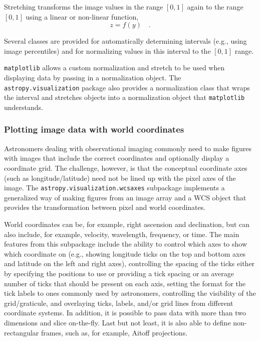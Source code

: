 \documentclass[modern]{aastex62}
\newcommand{\package}[1]{\texttt{#1}\xspace}
\begin{document}
Stretching transforms the image values in the range $[0,1]$ again to the range
$[0,1]$ using a linear or non-linear function,
\begin{equation}
z = f(y) \quad .
\end{equation}

Several classes are provided for automatically determining intervals
(e.g., using image percentiles) and for normalizing values in this interval to
the $[0,1]$ range.

\package{matplotlib} allows a custom normalization and stretch to be used when
displaying data by passing in a normalization object.
The \package{astropy.visualization} package also provides a normalization class
that wraps the interval and stretches objects into a normalization object that
\package{matplotlib} understands.

\subsubsection{Plotting image data with world coordinates}

Astronomers dealing with observational imaging commonly need to make figures
with images that include the correct coordinates and optionally display a
coordinate grid. The challenge, however, is that the conceptual coordinate axes
(such as longitude/latitude) need not be lined up with the pixel axes of the
image. The \package{astropy.visualization.wcsaxes} subpackage implements a
generalized way of making figures from an image array and a WCS object
that provides the transformation between pixel and world coordinates.

World coordinates can be, for example, right ascension and declination, but can
also include, for example, velocity, wavelength, frequency, or time.
The main features from this subpackage include the ability to control which
axes to show which coordinate on (e.g., showing longitude ticks on the
top and bottom axes and latitude on the left and right axes), controlling the
spacing of the ticks either by specifying the positions to use or providing a
tick spacing or an average number of ticks that should be present on each axis,
setting the format for the tick labels to ones commonly used by astronomers,
controlling the visibility of the grid/graticule, and overlaying ticks, labels,
and/or grid lines from different coordinate systems. In addition, it is
possible to pass data with more than two dimensions and slice on-the-fly.
Last but not least, it is also able to define non-rectangular frames, such as,
for example, Aitoff projections.
\end{document}
